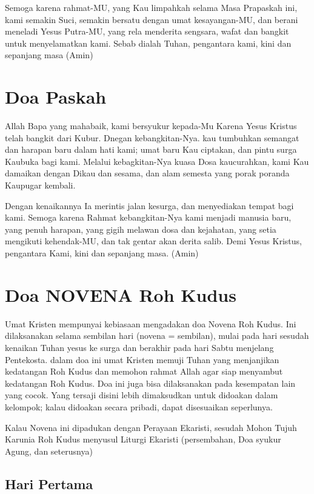 \documentclass[a5paper,titlepage,11pt]{book}
\begin{document}
    Semoga karena rahmat-MU, yang Kau limpahkah selama Masa Prapaskah ini, kami semakin Suci, semakin bersatu dengan umat kesayangan-MU, dan berani meneladi Yesus Putra-MU, yang rela menderita sengsara, wafat dan bangkit untuk menyelamatkan kami. Sebab dialah Tuhan, pengantara kami, kini dan sepanjang masa (Amin)


\section{Doa Paskah}    

    Allah Bapa yang mahabaik, kami bersyukur kepada-Mu Karena Yesus Kristus telah bangkit dari Kubur. Dnegan kebangkitan-Nya. kau tumbuhkan semangat dan harapan baru dalam hati kami; umat baru Kau ciptakan, dan pintu surga Kaubuka bagi kami. Melalui kebagkitan-Nya kuasa Dosa kaucurahkan, kami Kau damaikan dengan Dikau dan sesama, dan alam semesta yang porak poranda Kaupugar kembali.

    Dengan kenaikannya Ia merintis jalan kesurga, dan menyediakan tempat bagi kami. Semoga karena Rahmat kebangkitan-Nya kami menjadi manusia baru, yang penuh harapan, yang gigih melawan dosa dan kejahatan, yang setia mengikuti kehendak-MU, dan tak gentar akan derita salib. Demi Yesus Kristus, pengantara Kami, kini dan sepanjang masa. (Amin)
\normalsize
\section{Doa NOVENA Roh Kudus}
\scriptsize
    Umat Kristen mempunyai kebiasaan mengadakan doa Novena Roh Kudus. Ini dilaksanakan selama sembilan hari (novena = sembilan), mulai pada hari sesudah kenaikan Tuhan yesus ke surga dan berakhir pada hari Sabtu menjelang Pentekosta. dalam doa ini umat Kristen memuji Tuhan yang menjanjikan kedatangan Roh Kudus dan memohon rahmat Allah agar siap menyambut kedatangan Roh Kudus. Doa ini juga bisa dilaksanakan pada kesempatan lain yang cocok. Yang tersaji disini lebih dimaksudkan untuk didoakan dalam kelompok; kalau didoakan secara pribadi, dapat disesuaikan seperlunya.

    Kalau Novena ini dipadukan dengan Perayaan Ekaristi, sesudah Mohon Tujuh Karunia Roh Kudus menyusul Liturgi Ekaristi (persembahan, Doa syukur Agung, dan seterusnya)
 
\normalsize
\subsection*{Hari Pertama}
\end{document}
